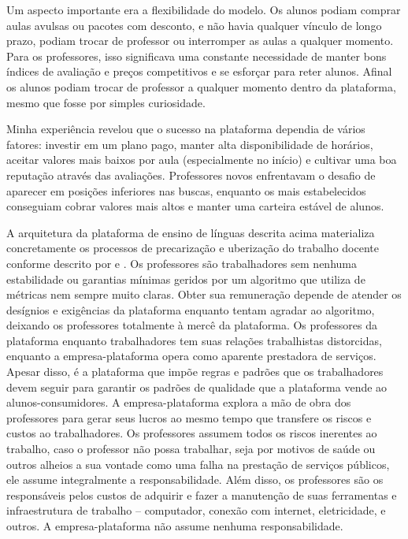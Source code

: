 \documentclass[portuguese]{textolivre}
\begin{document}
Um aspecto importante era a flexibilidade do modelo. Os alunos podiam comprar aulas avulsas ou pacotes com desconto, e não havia qualquer vínculo de longo prazo, podiam trocar de professor ou interromper as aulas a qualquer momento. Para os professores, isso significava uma constante necessidade de manter bons índices de avaliação e preços competitivos e se esforçar para reter alunos. Afinal os alunos podiam trocar de professor a qualquer momento dentro da plataforma, mesmo que fosse por simples curiosidade.

Minha experiência revelou que o sucesso na plataforma dependia de vários fatores: investir em um plano pago, manter alta disponibilidade de horários, aceitar valores mais baixos por aula (especialmente no início) e cultivar uma boa reputação através das avaliações. Professores novos enfrentavam o desafio de aparecer em posições inferiores nas buscas, enquanto os mais estabelecidos conseguiam cobrar valores mais altos e manter uma carteira estável de alunos.

A arquitetura da plataforma de ensino de línguas descrita acima materializa concretamente os processos de precarização e uberização do trabalho docente conforme descrito por \textcite{antunes2020} e \textcite{standing2014}. Os professores são trabalhadores sem nenhuma estabilidade ou garantias mínimas geridos por um algoritmo que utiliza de métricas nem sempre muito claras. Obter sua remuneração depende de atender os desígnios e exigências da plataforma enquanto tentam agradar ao algoritmo, deixando os professores totalmente à mercê da plataforma. Os professores da plataforma enquanto trabalhadores tem suas relações trabalhistas distorcidas, enquanto a empresa-plataforma opera como aparente prestadora de serviços. Apesar disso, é a plataforma que impõe regras e padrões que os trabalhadores devem seguir para garantir os padrões de qualidade que a plataforma vende ao alunos-consumidores. A empresa-plataforma explora a mão de obra dos professores para gerar seus lucros ao mesmo tempo que transfere os riscos e custos ao trabalhadores. Os professores assumem todos os riscos inerentes ao trabalho, caso o professor não possa trabalhar, seja por motivos de saúde ou outros alheios a sua vontade como uma falha na prestação de serviços públicos, ele assume integralmente a responsabilidade. Além disso, os professores são os responsáveis pelos custos de adquirir e fazer a manutenção de suas ferramentas e infraestrutura de trabalho -- computador, conexão com internet, eletricidade, e outros. A empresa-plataforma não assume nenhuma responsabilidade.
\end{document}
